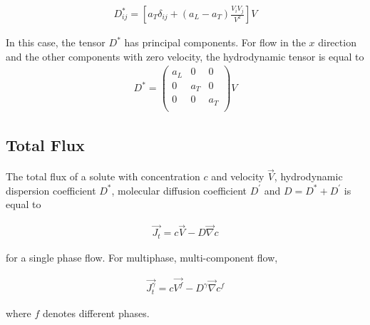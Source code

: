 \documentclass[11pt,twoside]{report}
\begin{document}
\begin{align}
   D^{*}_{ij} = \left[a_{T}\delta_{ij} + (a_{L} - a_{T})\frac{V_{i}V_{j}}{V^{2}} \right]V
\end{align}

In this case, the tensor $D^{*}$ has principal components. For flow in the $x$ direction and the other components with zero velocity, the hydrodynamic tensor is equal to 
\begin{align}
D^{*} =    
\begin{pmatrix}
   a_{L} &   0   &    0\\
   0     & a_{T} &    0\\
   0     &   0   &   a_{T}\\
\end{pmatrix}
V
\end{align}

\subsection{Total Flux}
The total flux of a solute with concentration $c$ and velocity $\vec{V}$, hydrodynamic dispersion coefficient $D^{*}$, molecular diffusion coefficient $D^{'}$ and $D = D^{*} + D^{'}$ is equal to 

\begin{align}
   \vec{J_{t}} = c\vec{V} - D \vec{\nabla}c
\end{align}

for a single phase flow. For multiphase, multi-component flow,

\begin{align}
   \vec{J_{t}^{\gamma}} = c\vec{V^{f}} - D^{\gamma} \vec{\nabla}c^{f}
\end{align}

where $f$ denotes different phases. 



\end{document}

